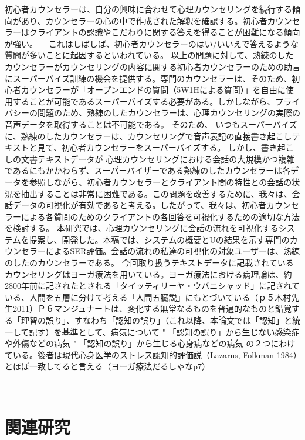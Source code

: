 \documentclass[shuuron]{kuee}
\begin{document}
  初心者カウンセラーは、自分の興味に合わせて心理カウンセリングを続行する傾向があり、カウンセラーの心の中で作成された解釈を確認する。初心者カウンセラーはクライアントの認識やこだわりに関する答えを得ることが困難になる傾向が強い。
　これはしばしば、初心者カウンセラーのはい/いいえで答えるような質問が多いことに起因するといわれている。
 以上の問題に対して、熟練のしたカウンセラーがカウンセリングの内容に関する初心者カウンセラーのための助言にスーパーバイズ訓練の機会を提供する。専門のカウンセラーは、そのため、初心者カウンセラーが「オープンエンドの質問（5W1Hによる質問）」を自由に使用することが可能であるスーパーバイズする必要がある。しかしながら、プライバシーの問題のため、熟練のしたカウンセラーは、心理カウンセリングの実際の音声データを取得することは不可能である。 そのため、 いつもスーパーバイズに、熟練のしたカウンセラーは、カウンセリングで音声表記の直接書き起こしテキストと見て、初心者カウンセラーをスーパーバイズする。
  しかし、書き起こしの文書テキストデータが 心理カウンセリングにおける会話の大規模かつ複雑であるにもかかわらず、スーパーバイザーである熟練のしたカウンセラーは各データを参照しながら、初心者カウンセラーとクライアント間の特性との会話の状況を抽出することは非常に困難である。この問題を改善するために、我々は、会話データの可視化が有効であると考える。したがって、我々は、初心者カウンセラーによる各質問のためのクライアントの各回答を可視化するための適切な方法を検討する。
  本研究では、心理カウンセリングに会話の流れを可視化するシステムを提案し、開発した。本稿では、システムの概要とUの結果を示す専門のカウンセラーによるSER評価。会話の流れの私達の可視化の対象ユーザーは、熟練のしたのカウンセラーである。
今回取り扱うテキストデータに記載されているカウンセリングはヨーガ療法を用いている。ヨーガ療法における病理論は、約2800年前に記されたとされる「タイッティリーヤ・ウパニシャッド」に記されている、人間を五層に分けて考える「人間五臓説」にもとづいている（ｐ５木村先生2011）Ｐ６マンジュナートは、変化する無常なるものを普遍的なものと錯覚する「理智の誤り」、すなわち「認知の誤り」（これ以降、本論文では「認知」と統一して記す）を基準として、病気について
"	「認知の誤り」から生じない感染症や外傷などの病気
"	「認知の誤り」から生じる心身病などの病気
の２つにわけている。後者は現代心身医学のストレス認知的評価説（Lazarus, Folkman 1984）とほぼ一致してると言える（ヨーガ療法だるしゃなp7）


　

\chapter{関連研究}
\end{document}
